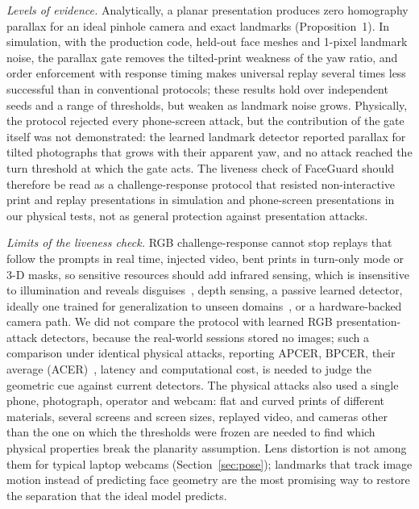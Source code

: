 \documentclass[journal]{IEEEtran}
\newcommand{\sys}{FaceGuard}
\begin{document}
\emph{Levels of evidence.} Analytically, a planar presentation produces zero homography parallax for an ideal pinhole camera and exact landmarks (Proposition~1). In simulation, with the production code, held-out face meshes and 1-pixel landmark noise, the parallax gate removes the tilted-print weakness of the yaw ratio, and order enforcement with response timing makes universal replay several times less successful than in conventional protocols; these results hold over independent seeds and a range of thresholds, but weaken as landmark noise grows. Physically, the protocol rejected every phone-screen attack, but the contribution of the gate itself was not demonstrated: the learned landmark detector reported parallax for tilted photographs that grows with their apparent yaw, and no attack reached the turn threshold at which the gate acts. The liveness check of \sys{} should therefore be read as a challenge-response protocol that resisted non-interactive print and replay presentations in simulation and phone-screen presentations in our physical tests, not as general protection against presentation attacks.

\emph{Limits of the liveness check.} RGB challenge-response cannot stop replays that follow the prompts in real time, injected video, bent prints in turn-only mode or 3-D masks, so sensitive resources should add infrared sensing, which is insensitive to illumination and reveals disguises~\cite{athira2018thermal}, depth sensing, a passive learned detector, ideally one trained for generalization to unseen domains~\cite{liu2018auxiliary,wang2022ssan}, or a hardware-backed camera path. We did not compare the protocol with learned RGB presentation-attack detectors, because the real-world sessions stored no images; such a comparison under identical physical attacks, reporting APCER, BPCER, their average (ACER)~\cite{iso30107-3}, latency and computational cost, is needed to judge the geometric cue against current detectors. The physical attacks also used a single phone, photograph, operator and webcam: flat and curved prints of different materials, several screens and screen sizes, replayed video, and cameras other than the one on which the thresholds were frozen are needed to find which physical properties break the planarity assumption. Lens distortion is not among them for typical laptop webcams (Section~\ref{sec:pose}); landmarks that track image motion instead of predicting face geometry are the most promising way to restore the separation that the ideal model predicts.
\end{document}
